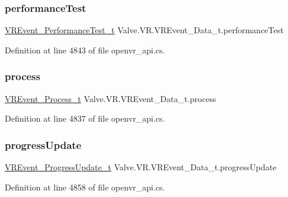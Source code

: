 \subsubsection{\texorpdfstring{performanceTest}{performanceTest}}
{\footnotesize\ttfamily \mbox{\hyperlink{struct_valve_1_1_v_r_1_1_v_r_event___performance_test__t}{V\+R\+Event\+\_\+\+Performance\+Test\+\_\+t}} Valve.\+V\+R.\+V\+R\+Event\+\_\+\+Data\+\_\+t.\+performance\+Test}



Definition at line 4843 of file openvr\+\_\+api.\+cs.

\mbox{\label{struct_valve_1_1_v_r_1_1_v_r_event___data__t_acbb12d920d5408cbd61c91e86d0f2328}} 
\subsubsection{\texorpdfstring{process}{process}}
{\footnotesize\ttfamily \mbox{\hyperlink{struct_valve_1_1_v_r_1_1_v_r_event___process__t}{V\+R\+Event\+\_\+\+Process\+\_\+t}} Valve.\+V\+R.\+V\+R\+Event\+\_\+\+Data\+\_\+t.\+process}



Definition at line 4837 of file openvr\+\_\+api.\+cs.

\mbox{\label{struct_valve_1_1_v_r_1_1_v_r_event___data__t_aede75cf09b3c5ab6a0b7cd00b9136c72}} 
\subsubsection{\texorpdfstring{progressUpdate}{progressUpdate}}
{\footnotesize\ttfamily \mbox{\hyperlink{struct_valve_1_1_v_r_1_1_v_r_event___progress_update__t}{V\+R\+Event\+\_\+\+Progress\+Update\+\_\+t}} Valve.\+V\+R.\+V\+R\+Event\+\_\+\+Data\+\_\+t.\+progress\+Update}



Definition at line 4858 of file openvr\+\_\+api.\+cs.

\mbox{\label{struct_valve_1_1_v_r_1_1_v_r_event___data__t_a00d0c33eac2c8bad5e3a11945b479787}} 

